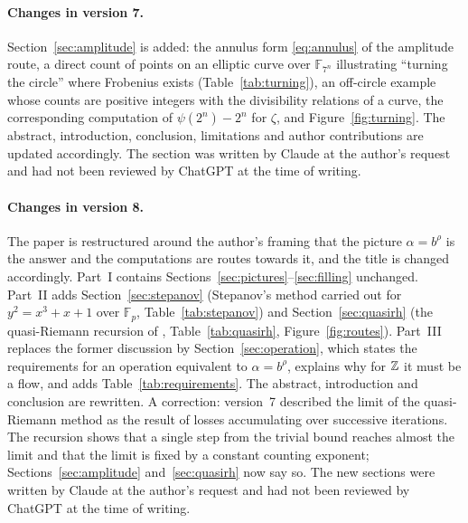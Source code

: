 \documentclass[11pt,a4paper]{article}
\theoremstyle{definition}\newtheorem{definition}[proposition]{Definition}
\theoremstyle{remark}\newtheorem{remark}[proposition]{Remark}
\begin{document}
\paragraph{Changes in version 7.} Section~\ref{sec:amplitude} is added: the annulus form \eqref{eq:annulus} of the amplitude route, a direct count of points on an elliptic curve over $\mathbb F_{7^n}$ illustrating ``turning the circle'' where Frobenius exists (Table~\ref{tab:turning}), an off-circle example whose counts are positive integers with the divisibility relations of a curve, the corresponding computation of $\psi(2^n)-2^n$ for $\zeta$, and Figure~\ref{fig:turning}. The abstract, introduction, conclusion, limitations and author contributions are updated accordingly. The section was written by Claude at the author's request and had not been reviewed by ChatGPT at the time of writing.

\paragraph{Changes in version 8.} The paper is restructured around the author's framing that the picture $\alpha=b^\rho$ is the answer and the computations are routes towards it, and the title is changed accordingly. Part~I contains Sections~\ref{sec:pictures}--\ref{sec:filling} unchanged. Part~II adds Section~\ref{sec:stepanov} (Stepanov's method carried out for $y^2=x^3+x+1$ over $\mathbb F_p$, Table~\ref{tab:stepanov}) and Section~\ref{sec:quasirh} (the quasi-Riemann recursion of \cite{Liu2026}, Table~\ref{tab:quasirh}, Figure~\ref{fig:routes}). Part~III replaces the former discussion by Section~\ref{sec:operation}, which states the requirements for an operation equivalent to $\alpha=b^\rho$, explains why for $\mathbb Z$ it must be a flow, and adds Table~\ref{tab:requirements}. The abstract, introduction and conclusion are rewritten. A correction: version~7 described the limit of the quasi-Riemann method as the result of losses accumulating over successive iterations. The recursion shows that a single step from the trivial bound reaches almost the limit and that the limit is fixed by a constant counting exponent; Sections~\ref{sec:amplitude} and~\ref{sec:quasirh} now say so. The new sections were written by Claude at the author's request and had not been reviewed by ChatGPT at the time of writing.
\end{document}
